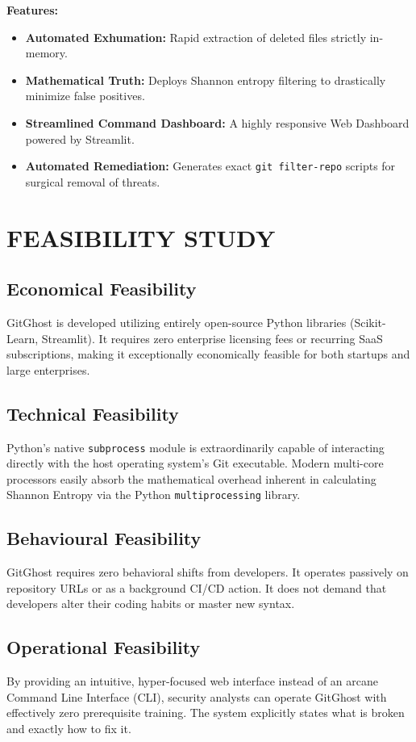 \documentclass[12pt, a4paper, oneside]{report}
\begin{document}
\textbf{Features:}
\begin{itemize}
    \item \textbf{Automated Exhumation:} Rapid extraction of deleted files strictly in-memory.
    \item \textbf{Mathematical Truth:} Deploys Shannon entropy filtering to drastically minimize false positives.
    \item \textbf{Streamlined Command Dashboard:} A highly responsive Web Dashboard powered by Streamlit.
    \item \textbf{Automated Remediation:} Generates exact \texttt{git filter-repo} scripts for surgical removal of threats.
\end{itemize}

\section{FEASIBILITY STUDY}

\subsection{Economical Feasibility}
GitGhost is developed utilizing entirely open-source Python libraries (Scikit-Learn, Streamlit). It requires zero enterprise licensing fees or recurring SaaS subscriptions, making it exceptionally economically feasible for both startups and large enterprises.

\subsection{Technical Feasibility}
Python's native \texttt{subprocess} module is extraordinarily capable of interacting directly with the host operating system's Git executable. Modern multi-core processors easily absorb the mathematical overhead inherent in calculating Shannon Entropy via the Python \texttt{multiprocessing} library.

\subsection{Behavioural Feasibility}
GitGhost requires zero behavioral shifts from developers. It operates passively on repository URLs or as a background CI/CD action. It does not demand that developers alter their coding habits or master new syntax.

\subsection{Operational Feasibility}
By providing an intuitive, hyper-focused web interface instead of an arcane Command Line Interface (CLI), security analysts can operate GitGhost with effectively zero prerequisite training. The system explicitly states what is broken and exactly how to fix it.
\end{document}
